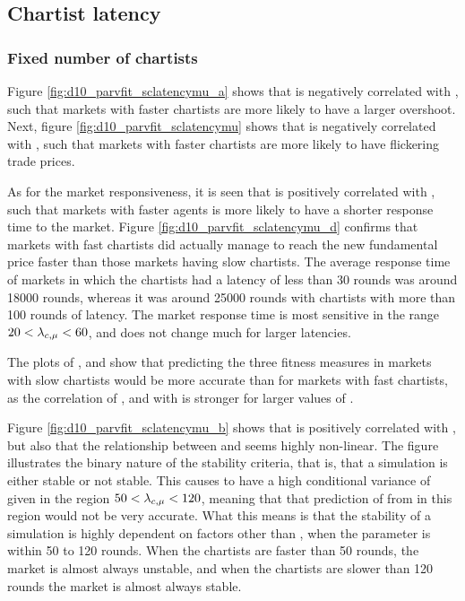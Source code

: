 \subsection{Chartist latency}

\subsubsection*{Fixed number of chartists}

Figure \ref{fig:d10_parvfit_sclatencymu_a} shows that \sclatencymu is negatively correlated with \overshoot, such that markets with faster chartists are more likely to have a larger overshoot.  Next, figure \ref{fig:d10_parvfit_sclatencymu}  shows that \sclatencymu is negatively correlated with \stdev, such that markets with faster chartists are more likely to have flickering trade prices. 

As for the market responsiveness, it is seen that \sclatencymu is positively correlated with \timetoreachnewfundamental, such that markets with faster agents is more likely to have a shorter response time to the market. Figure \ref{fig:d10_parvfit_sclatencymu_d} confirms that markets with fast chartists did actually manage to reach the new fundamental price faster than those markets having slow chartists. The average response time of markets in which the chartists had a latency of less than 30 rounds was around 18000 rounds, whereas it was around 25000 rounds with chartists with more than 100 rounds of latency. The market response time is most sensitive in the range $20< \lambda_{c, \mu}<60$, and does not change much for larger latencies. 

The plots of \overshoot, \stdev and \timetoreachnewfundamental show that predicting the three fitness measures in markets with slow chartists would be more accurate than for markets with fast chartists, as the correlation of \overshoot, \stdev and \timetoreachnewfundamental with \sclatencymu is stronger for larger values of \sclatencymu. 

Figure \ref{fig:d10_parvfit_sclatencymu_b} shows that \sclatencymu is positively correlated with \roundstable, but also that the relationship between \sclatencymu and \roundstable seems highly non-linear. The figure illustrates the binary nature of the stability criteria, that is, that a simulation is either stable or not stable. This causes \roundstable to have a high conditional variance of \roundstable given \sclatencymu in the region $50 < \lambda_{c, \mu} < 120$, meaning that that prediction of \roundstable from \sclatencymu in this region would not be very accurate. What this means is that the stability of a simulation is highly dependent on factors other than \sclatencymu, when the parameter is within 50 to 120 rounds. When the chartists are faster than 50 rounds, the market is almost always unstable, and when the chartists are slower than 120 rounds the market is almost always stable. 

